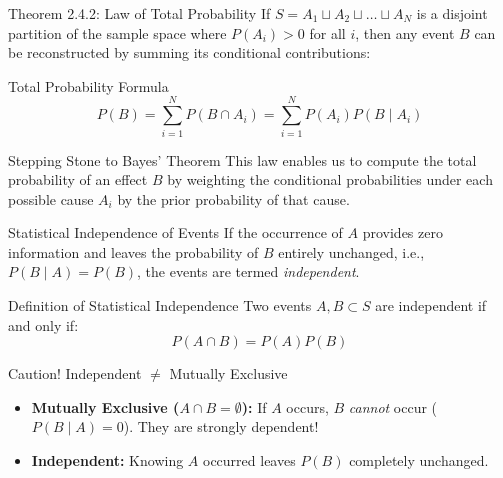 \documentclass[10pt,aspectratio=169]{beamer}
\begin{document}
\begin{frame}{Theorem 2.4.2: Law of Total Probability}
  \small If $S = A_1 \sqcup A_2 \sqcup \dots \sqcup A_N$ is a disjoint partition of the sample space where $P(A_i) > 0$ for all $i$, then any event $B$ can be reconstructed by summing its conditional contributions: \pause

  \vspace{0.2em}
  \begin{block}{Total Probability Formula}
    $$P(B) = \sum_{i=1}^{N} P(B \cap A_i) = \sum_{i=1}^{N} P(A_i) P(B \mid A_i)$$
  \end{block}

  \vspace{0.2em}
  \pause
  \begin{alertblock}{Stepping Stone to Bayes' Theorem}
    This law enables us to compute the total probability of an effect $B$ by weighting the conditional probabilities under each possible cause $A_i$ by the prior probability of that cause.
  \end{alertblock}
\end{frame}

\begin{frame}{Statistical Independence of Events}
  \small If the occurrence of $A$ provides zero information and leaves the probability of $B$ entirely unchanged, i.e., $P(B \mid A) = P(B)$, the events are termed \emph{independent}. \pause

  \vspace{0.2em}
  \begin{block}{Definition of Statistical Independence}
    Two events $A, B \subset S$ are independent if and only if:
    $$P(A \cap B) = P(A) P(B)$$
  \end{block}

  \vspace{0.1em}
  \pause
  \begin{alertblock}{Caution! Independent $\neq$ Mutually Exclusive}
    \begin{itemize}\itemsep=0.1em
      \item \textbf{Mutually Exclusive ($A \cap B = \emptyset$):} If $A$ occurs, $B$ \emph{cannot} occur ($P(B \mid A) = 0$). They are strongly dependent!
      \item \textbf{Independent:} Knowing $A$ occurred leaves $P(B)$ completely unchanged.
    \end{itemize}
  \end{alertblock}
\end{frame}
\end{document}
